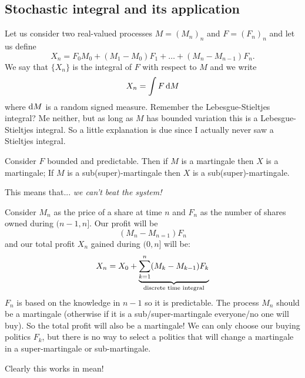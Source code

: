 \documentclass{report}
\begin{document}
\subsection{Stochastic integral and its application}
Let us consider two real-valued processes $M={(M_{n})}_{n}$ and $F={(F_{n})}_{n}$ and let us define
\[X_{n}=F_0M_{0}+(M_1-M_0)F_1+\ldots+(M_{n}-M_{n-1})F_n.\]
We say that $\{X_{n}\}$ is the integral of $F$ with respect to $M$ and we write
\[X_{n}=\int F \mathop{}\!\mathrm{d} M\]
where $\mathop{}\!\mathrm{d} M$ is a random signed measure. Remember the Lebesgue-Stieltjes integral? Me neither, but as long as $M$ has bounded variation this is a Lebesgue-Stieltjes integral. So a little explanation is due since I actually never saw a Stieltjes integral.
\begin{theorem}
	Consider $F$ bounded and predictable. Then if $M$ is a martingale then $X$ is a martingale; If $M$ is a sub(super)-martingale then $X$ is a sub(super)-martingale.
\end{theorem}
This means that... \emph{we can't beat the system!}
\begin{flushright}
	\hspace*{2.5cm}
\end{flushright}
\begin{example}
	Consider $M_{n}$ as the price of a share at time $n$ and $F_{n}$ as the number of shares owned during $(n-1,n]$. Our profit will be 
	\[(M_{n}-M_{n=1})F_{n}\]
	and our total profit $X_{n}$ gained during $(0,n]$ will be:
	\[X_{n}=X_{0}+\underbrace{\sum_{k=1}^{n}(M_{k}-M_{k-1})F_{k}}_{\mathclap{\text{discrete time integral}}}\]
	$F_{n}$ is based on the knowledge in $n-1$ so it is predictable. The process $M_{n}$ should be a martingale (otherwise if it is a sub/super-martingale everyone/no one will buy). So the total profit will also be a martingale! We can only choose our buying politics $F_{k}$, but there is no way to select a politics that will change a martingale in a super-martingale or sub-martingale.
\end{example}
Clearly this works in mean! 
\end{document}
